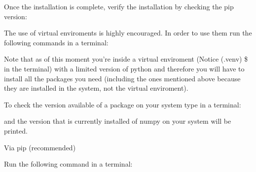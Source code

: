 \documentclass[letterpaper,10pt,english,openany, oneside]{sphinxmanual}
\begin{document}
%
\begin{sphinxVerbatim}[commandchars=\\\{\}]
  

   
\end{sphinxVerbatim}

Once the installation is complete, verify the installation by checking the pip version:

%
\begin{sphinxVerbatim}[commandchars=\\\{\}]
 
\end{sphinxVerbatim}

The use of virtual enviroments is highly encouraged. In order to use them run the following commands in a terminal:

%
\begin{sphinxVerbatim}[commandchars=\\\{\}]
   
   
 
\end{sphinxVerbatim}

Note that as of this moment you’re inside a virtual enviroment (Notice (.venv) \$ in the terminal) with a limited version of python and therefore you will have to install all the packages you need (including the ones mentioned above because they are installed in the system, not the virtual enviroment).

To check the version available of a package on your system type in a terminal:

%
\begin{sphinxVerbatim}[commandchars=\\\{\}]
  
\end{sphinxVerbatim}

and the version that is currently installed of numpy on your system will be printed.

Via pip (recommended)

Run the following command in a terminal:
\end{document}
